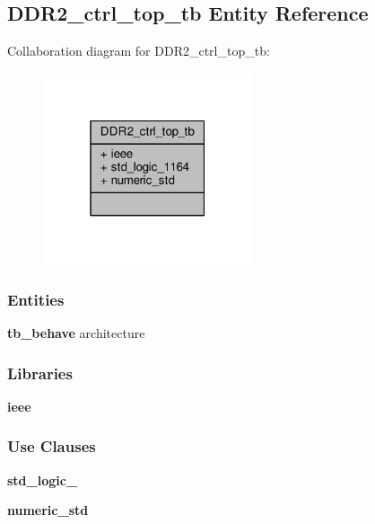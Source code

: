 \subsection{D\+D\+R2\+\_\+ctrl\+\_\+top\+\_\+tb Entity Reference}
\label{classDDR2__ctrl__top__tb}


Collaboration diagram for D\+D\+R2\+\_\+ctrl\+\_\+top\+\_\+tb\+:\nopagebreak
\begin{figure}[H]
\begin{center}
\leavevmode
\includegraphics[width=175pt]{de/db1/classDDR2__ctrl__top__tb__coll__graph}
\end{center}
\end{figure}
\subsubsection*{Entities}
\begin{DoxyCompactItemize}
\item 
{\bf tb\+\_\+behave} architecture
\end{DoxyCompactItemize}
\subsubsection*{Libraries}
 \begin{DoxyCompactItemize}
\item 
{\bf ieee} 
\end{DoxyCompactItemize}
\subsubsection*{Use Clauses}
 \begin{DoxyCompactItemize}
\item 
{\bf std\+\_\+logic\+\_}   
\item 
{\bf numeric\+\_\+std}   
\end{DoxyCompactItemize}


